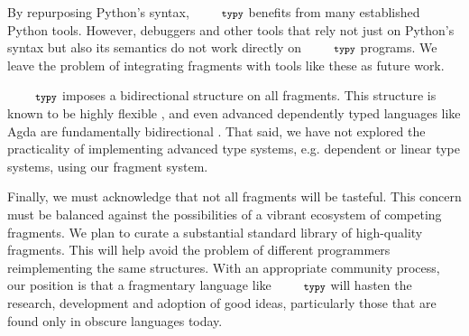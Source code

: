 \documentclass[10pt]{sigplanconf}
\newcommand{\typy}{\texttt{\footnotesize typy}}
\newcommand{\lip}[1]{\lstinline[language=Python,basicstyle=\ttfamily\footnotesize,morekeywords={with},deletendkeywords={tuple,buffer,map}]{#1}}
\newcommand{\li}[1]{\lip{#1}}
\begin{document}
By repurposing Python's syntax, $\typy$ benefits from many established Python tools. However, debuggers and other tools that rely not just on Python's syntax but also its semantics do not work directly on $\typy$ programs. We leave the problem of integrating fragments with tools like these as future work. %


$\typy$ imposes a bidirectional structure on all fragments. This structure is known to be highly flexible \cite{conf/icfp/DunfieldK13}, and even advanced dependently typed languages like Agda are fundamentally bidirectional \cite{norell2007towards}. That said, we have not explored the practicality of implementing advanced type systems, e.g. dependent or linear type systems, using our fragment system.  %


Finally, we must acknowledge that not all fragments will be tasteful. This concern must be balanced against the possibilities of a vibrant ecosystem of competing fragments. %
We plan to curate a substantial standard library of high-quality fragments. This will help avoid the problem of different programmers reimplementing the same structures. With an appropriate community process, our position is that a fragmentary language like $\typy$ will hasten the research, development and adoption of good ideas, particularly those that are found only in obscure languages today.
\end{document}

